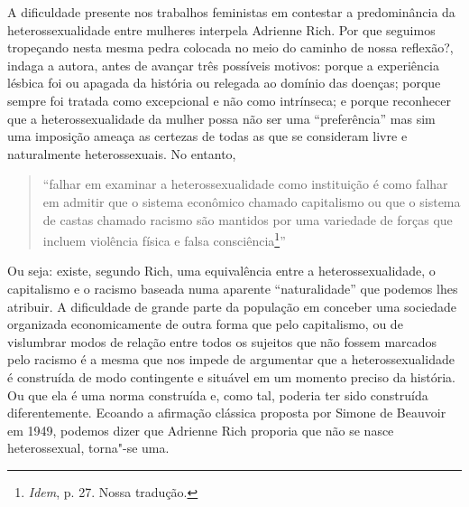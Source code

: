 A dificuldade presente nos trabalhos feministas em contestar a
predominância da heterossexualidade entre mulheres interpela Adrienne
Rich. Por que seguimos tropeçando nesta mesma pedra colocada no meio do
caminho de nossa reflexão?, indaga a autora, antes de avançar três
possíveis motivos: porque a experiência lésbica foi ou apagada da
história ou relegada ao domínio das doenças; porque sempre foi tratada
como excepcional e não como intrínseca; e porque reconhecer que a
heterossexualidade da mulher possa não ser uma ``preferência'' mas sim
uma imposição ameaça as certezas de todas as que se consideram livre e
naturalmente heterossexuais. No entanto,

\begin{quote}
``falhar em examinar a heterossexualidade como instituição é como falhar
em admitir que o sistema econômico chamado capitalismo ou que o sistema
de castas chamado racismo são mantidos por uma variedade de forças que
incluem violência física e falsa consciência\footnote{\emph{Idem}, p.
  27. Nossa tradução.}''
\end{quote}

Ou seja: existe, segundo Rich, uma equivalência entre a
heterossexualidade, o capitalismo e o racismo baseada numa aparente
``naturalidade'' que podemos lhes atribuir. A dificuldade de grande
parte da população em conceber uma sociedade organizada economicamente
de outra forma que pelo capitalismo, ou de vislumbrar modos de relação
entre todos os sujeitos que não fossem marcados pelo racismo é a mesma
que nos impede de argumentar que a heterossexualidade é construída de
modo contingente e situável em um momento preciso da história. Ou que
ela é uma norma construída e, como tal, poderia ter sido construída
diferentemente. Ecoando a afirmação clássica proposta por Simone de
Beauvoir em 1949, podemos dizer que Adrienne Rich proporia que não se
nasce heterossexual, torna"-se uma.

